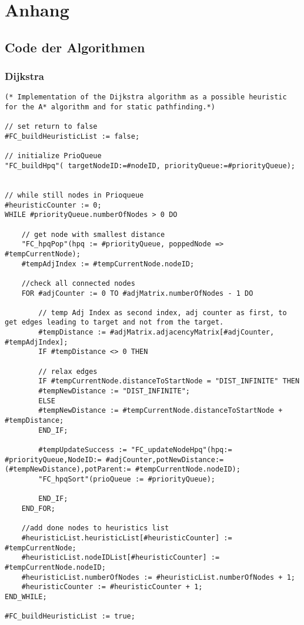 	
	\chapter{Anhang}
	
	\section{Code der Algorithmen}
	
	\subsection{Dijkstra}
	
	\begin{lstlisting}
(* Implementation of the Dijkstra algorithm as a possible heuristic for the A* algorithm and for static pathfinding.*)

// set return to false
#FC_buildHeuristicList := false;

// initialize PrioQueue
"FC_buildHpq"( targetNodeID:=#nodeID, priorityQueue:=#priorityQueue);


// while still nodes in Prioqueue
#heuristicCounter := 0;
WHILE #priorityQueue.numberOfNodes > 0 DO

	// get node with smallest distance
	"FC_hpqPop"(hpq := #priorityQueue, poppedNode => #tempCurrentNode);
	#tempAdjIndex := #tempCurrentNode.nodeID;
	
	//check all connected nodes
	FOR #adjCounter := 0 TO #adjMatrix.numberOfNodes - 1 DO
	
		// temp Adj Index as second index, adj counter as first, to get edges leading to target and not from the target. 
		#tempDistance := #adjMatrix.adjacencyMatrix[#adjCounter, #tempAdjIndex];
		IF #tempDistance <> 0 THEN
		
		// relax edges
		IF #tempCurrentNode.distanceToStartNode = "DIST_INFINITE" THEN
		#tempNewDistance := "DIST_INFINITE";
		ELSE
		#tempNewDistance := #tempCurrentNode.distanceToStartNode + #tempDistance;
		END_IF;
		
		#tempUpdateSuccess := "FC_updateNodeHpq"(hpq:= #priorityQueue,NodeID:= #adjCounter,potNewDistance:= (#tempNewDistance),potParent:= #tempCurrentNode.nodeID);
		"FC_hpqSort"(prioQueue := #priorityQueue);
		
		END_IF;
	END_FOR;
	
	//add done nodes to heuristics list
	#heuristicList.heuristicList[#heuristicCounter] := #tempCurrentNode;
	#heuristicList.nodeIDList[#heuristicCounter] := #tempCurrentNode.nodeID;
	#heuristicList.numberOfNodes := #heuristicList.numberOfNodes + 1;
	#heuristicCounter := #heuristicCounter + 1;
END_WHILE;

#FC_buildHeuristicList := true;
	\end{lstlisting}

